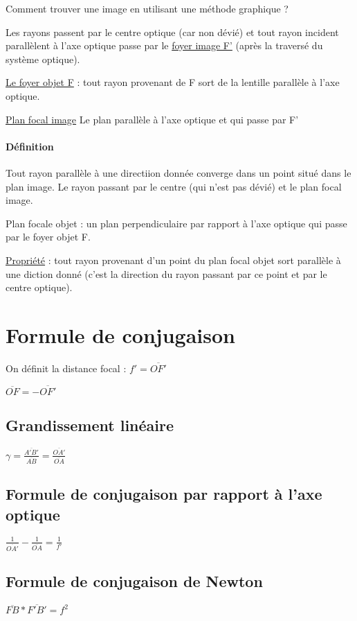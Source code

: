Comment trouver une image en utilisant une méthode graphique ?

Les rayons passent par le centre optique (car non dévié) et tout rayon incident parallèlent à l'axe optique passe par le \ul{foyer image F'} (après la traversé du système optique).

\ul{Le foyer objet F} : tout rayon provenant de F sort de la lentille parallèle à l'axe optique.

\ul{Plan focal image} Le plan parallèle à l'axe optique et qui passe par F'

\paragraph{Définition} Tout rayon parallèle à une directiion donnée converge dans un point situé dans le plan image. Le rayon passant par le centre (qui n'est pas dévié) et le plan focal image.

Plan focale objet : un plan perpendiculaire par rapport à l'axe optique qui passe par le foyer objet F.

\ul{Propriété} : tout rayon provenant d'un point du plan focal objet sort parallèle à une diction donné (c'est la direction du rayon passant par ce point et par le centre optique).

\section{Formule de conjugaison}

On définit la distance focal : $f' = \overline{OF'}$

$\overline{OF} = - \overline{OF'}$

\subsection{Grandissement linéaire}

$\gamma = \frac{\overline{A'B'}}{\overline{AB}} =\frac{\overline{OA'}}{\overline{OA}}$

\subsection{Formule de conjugaison par rapport à l'axe optique}

$\frac{1}{\overline{OA'}} - \frac{1}{\overline{OA}} = \frac{1}{f'}$

\subsection{Formule de conjugaison de Newton}

$\overline{FB}*\overline{F'B'} = f^2$
